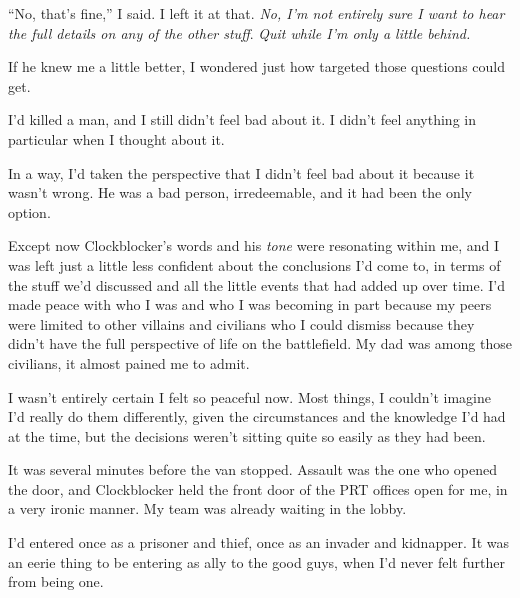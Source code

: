 ``No, that's fine,'' I said.  I left it at that.  \emph{No, I'm not entirely sure I want to hear the full details on any of the other stuff}.  \emph{Quit while I'm only a little behind.}



If he knew me a little better, I wondered just how targeted those questions could get.



I'd killed a man, and I still didn't feel bad about it.  I didn't feel anything in particular when I thought about it.



In a way, I'd taken the perspective that I didn't feel bad about it because it wasn't wrong.  He was a bad person, irredeemable, and it had been the only option.



Except now Clockblocker's words and his \emph{tone} were resonating within me, and I was left just a little less confident about the conclusions I'd come to, in terms of the stuff we'd discussed and all the little events that had added up over time.  I'd made peace with who I was and who I was becoming in part because my peers were limited to other villains and civilians who I could dismiss because they didn't have the full perspective of life on the battlefield.  My dad was among those civilians, it almost pained me to admit.



I wasn't entirely certain I felt so peaceful now.  Most things, I couldn't imagine I'd really do them differently, given the circumstances and the knowledge I'd had at the time, but the decisions weren't sitting quite so easily as they had been.



It was several minutes before the van stopped.  Assault was the one who opened the door, and Clockblocker held the front door of the PRT offices open for me, in a very ironic manner.  My team was already waiting in the lobby.



I'd entered once as a prisoner and thief, once as an invader and kidnapper.  It was an eerie thing to be entering as ally to the good guys, when I'd never felt further from being one.





